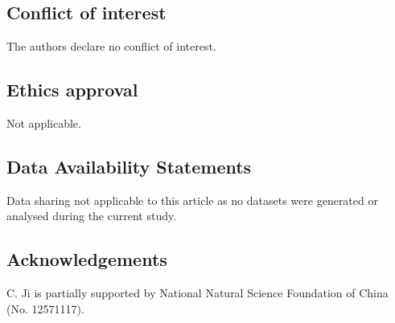 \documentclass[11pt]{amsart}
\theoremstyle{definition}
\theoremstyle{plain}
\numberwithin{equation}{section}
\begin{document}
\subsection*{Conflict of interest}

The authors declare no conflict of interest.

\subsection*{Ethics approval}
 Not applicable.

\subsection*{Data Availability Statements}
Data sharing not applicable to this article as no datasets were generated or analysed during the current study.

\subsection*{Acknowledgements}
 C. Ji is partially supported by National Natural Science Foundation of China (No. 12571117).
\end{document}
